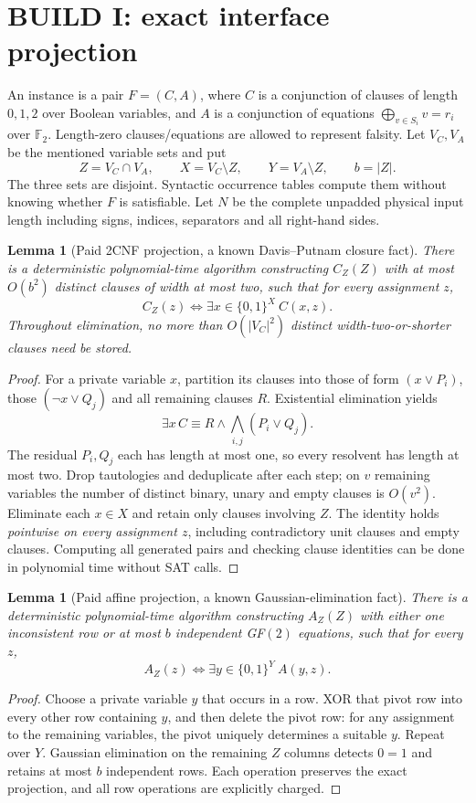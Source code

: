 \documentclass[11pt]{article}
\newtheorem{lemma}[theorem]{Lemma}
\begin{document}
\section{BUILD I: exact interface projection}
An instance is a pair $F=(C,A)$, where $C$ is a conjunction of clauses of length $0,1,2$ over Boolean variables, and $A$ is a conjunction of equations $\bigoplus_{v\in S_i}v=r_i$ over $\mathbb F_2$. Length-zero clauses/equations are allowed to represent falsity. Let $V_C,V_A$ be the mentioned variable sets and put
\[
 Z=V_C\cap V_A,\qquad X=V_C\setminus Z,\qquad Y=V_A\setminus Z,\qquad b=|Z|.
\]
The three sets are disjoint. Syntactic occurrence tables compute them without knowing whether $F$ is satisfiable. Let $N$ be the complete unpadded physical input length including signs, indices, separators and all right-hand sides.

\begin{lemma}[Paid 2CNF projection, a known Davis--Putnam closure fact]
There is a deterministic polynomial-time algorithm constructing $C_Z(Z)$ with at most $O(b^2)$ distinct clauses of width at most two, such that for every assignment $z$,
\[
 C_Z(z)\iff\exists x\in\{0,1\}^{X}\ C(x,z).
\]
Throughout elimination, no more than $O(|V_C|^2)$ distinct width-two-or-shorter clauses need be stored.
\end{lemma}
\begin{proof}
For a private variable $x$, partition its clauses into those of form $(x\lor P_i)$, those $(\neg x\lor Q_j)$ and all remaining clauses $R$. Existential elimination yields
\[
 \exists x\, C\equiv R\wedge\bigwedge_{i,j}(P_i\lor Q_j).
\]
The residual $P_i,Q_j$ each has length at most one, so every resolvent has length at most two. Drop tautologies and deduplicate after each step; on $v$ remaining variables the number of distinct binary, unary and empty clauses is $O(v^2)$. Eliminate each $x\in X$ and retain only clauses involving $Z$. The identity holds \emph{pointwise on every assignment $z$}, including contradictory unit clauses and empty clauses. Computing all generated pairs and checking clause identities can be done in polynomial time without SAT calls.
\end{proof}

\begin{lemma}[Paid affine projection, a known Gaussian-elimination fact]
There is a deterministic polynomial-time algorithm constructing $A_Z(Z)$ with either one inconsistent row or at most $b$ independent GF$(2)$ equations, such that for every $z$,
\[
 A_Z(z)\iff\exists y\in\{0,1\}^{Y}\ A(y,z).
\]
\end{lemma}
\begin{proof}
Choose a private variable $y$ that occurs in a row. XOR that pivot row into every other row containing $y$, and then delete the pivot row: for any assignment to the remaining variables, the pivot uniquely determines a suitable $y$. Repeat over $Y$. Gaussian elimination on the remaining $Z$ columns detects $0=1$ and retains at most $b$ independent rows. Each operation preserves the exact projection, and all row operations are explicitly charged.
\end{proof}
\end{document}
